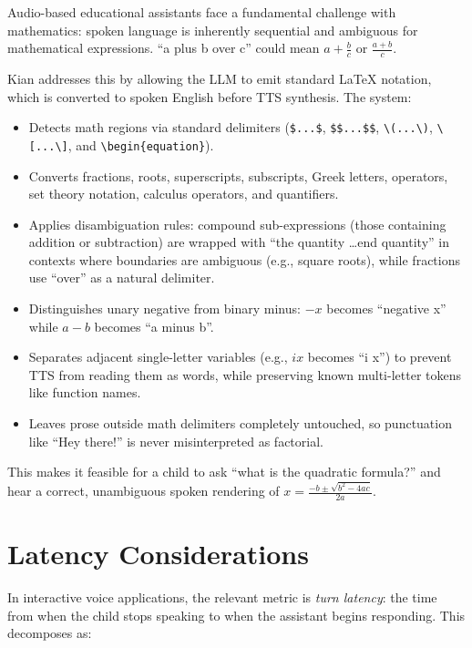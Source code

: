 \documentclass[11pt]{article}
\begin{document}
Audio-based educational assistants face a fundamental challenge with mathematics: spoken language is inherently sequential and ambiguous for mathematical expressions. ``a plus b over c'' could mean $a + \frac{b}{c}$ or $\frac{a+b}{c}$.

Kian addresses this by allowing the LLM to emit standard LaTeX notation, which is converted to spoken English before TTS synthesis. The system:

\begin{itemize}[nosep]
  \item Detects math regions via standard delimiters (\texttt{\$...\$}, \texttt{\$\$...\$\$}, \verb|\(...\)|, \verb|\[...\]|, and \verb|\begin{equation}|).
  \item Converts fractions, roots, superscripts, subscripts, Greek letters, operators, set theory notation, calculus operators, and quantifiers.
  \item Applies disambiguation rules: compound sub-expressions (those containing addition or subtraction) are wrapped with ``the quantity \ldots end quantity'' in contexts where boundaries are ambiguous (e.g., square roots), while fractions use ``over'' as a natural delimiter.
  \item Distinguishes unary negative from binary minus: $-x$ becomes ``negative x'' while $a - b$ becomes ``a minus b''.
  \item Separates adjacent single-letter variables (e.g., $ix$ becomes ``i x'') to prevent TTS from reading them as words, while preserving known multi-letter tokens like function names.
  \item Leaves prose outside math delimiters completely untouched, so punctuation like ``Hey there!'' is never misinterpreted as factorial.
\end{itemize}

\noindent This makes it feasible for a child to ask ``what is the quadratic formula?'' and hear a correct, unambiguous spoken rendering of $x = \frac{-b \pm \sqrt{b^2 - 4ac}}{2a}$.

\section{Latency Considerations}

In interactive voice applications, the relevant metric is \emph{turn latency}: the time from when the child stops speaking to when the assistant begins responding. This decomposes as:
\end{document}
